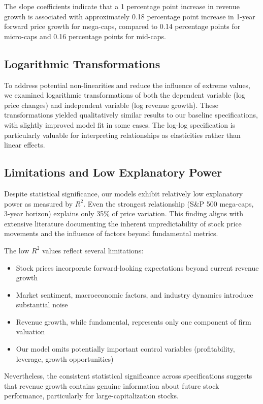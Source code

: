 \documentclass[11pt]{article}
\begin{document}
The slope coefficients indicate that a 1 percentage point increase in revenue growth is associated with approximately 0.18 percentage point increase in 1-year forward price growth for mega-caps, compared to 0.14 percentage points for micro-caps and 0.16 percentage points for mid-caps.

\subsection{Logarithmic Transformations}

To address potential non-linearities and reduce the influence of extreme values, we examined logarithmic transformations of both the dependent variable (log price changes) and independent variable (log revenue growth). These transformations yielded qualitatively similar results to our baseline specifications, with slightly improved model fit in some cases. The log-log specification is particularly valuable for interpreting relationships as elasticities rather than linear effects.

\subsection{Limitations and Low Explanatory Power}

Despite statistical significance, our models exhibit relatively low explanatory power as measured by $R^2$. Even the strongest relationship (S\&P 500 mega-caps, 3-year horizon) explains only 35\% of price variation. This finding aligns with extensive literature documenting the inherent unpredictability of stock price movements and the influence of factors beyond fundamental metrics.

The low $R^2$ values reflect several limitations:
\begin{itemize}
\item Stock prices incorporate forward-looking expectations beyond current revenue growth
\item Market sentiment, macroeconomic factors, and industry dynamics introduce substantial noise
\item Revenue growth, while fundamental, represents only one component of firm valuation
\item Our model omits potentially important control variables (profitability, leverage, growth opportunities)
\end{itemize}

Nevertheless, the consistent statistical significance across specifications suggests that revenue growth contains genuine information about future stock performance, particularly for large-capitalization stocks.
\end{document}
